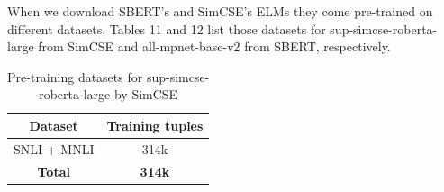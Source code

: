 \documentclass[sigconf, anonymous=true]{acmart}
\begin{document}
When we download SBERT's and SimCSE's ELMs they come pre-trained on different datasets. Tables 11 and 12 list those datasets for sup-simcse-roberta-large from SimCSE and all-mpnet-base-v2 from SBERT, respectively. 

\begin{table}[H]
\setlength{} %
\footnotesize\centering
\begin{tabular}{cc}
\hline \textbf{Dataset}  & \textbf{Training tuples} \\
\hline
SNLI + MNLI & 314k \\
\hline
\textbf{Total} &\textbf{314k} \\
\hline
\end{tabular}
\caption{Pre-training datasets for sup-simcse-roberta-large by SimCSE}
\label{tab:SimCSE}
\end{table}
\end{document}
